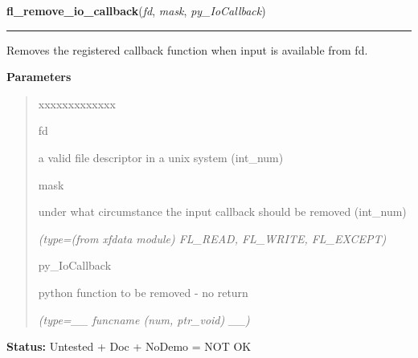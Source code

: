     \vspace{0.5ex}

\hspace{.8\funcindent}\begin{boxedminipage}{\funcwidth}

    \raggedright \textbf{fl\_remove\_io\_callback}(\textit{fd}, \textit{mask}, \textit{py\_IoCallback})

    \vspace{-1.5ex}

    \rule{\textwidth}{0.5\fboxrule}
\setlength{\parskip}{2ex}
    Removes the registered callback function when input is available from 
    fd.

\setlength{\parskip}{1ex}
      \textbf{Parameters}
      \vspace{-1ex}

      \begin{quote}
        \begin{Ventry}{xxxxxxxxxxxxx}

          \item[fd]

          a valid file descriptor in a unix system (int\_num)

          \item[mask]

          under what circumstance the input callback should be removed 
          (int\_num)

            {\it (type=(from xfdata module) FL\_READ, FL\_WRITE, FL\_EXCEPT)}

          \item[py\_IoCallback]

          python function to be removed - no return

            {\it (type=\_\_ funcname (num, ptr\_void) \_\_)}

        \end{Ventry}

      \end{quote}

\textbf{Status:} Untested + Doc + NoDemo = NOT OK



    \end{boxedminipage}

    \label{xformslib:library:fl_add_signal_callback}

    \vspace{0.5ex}

